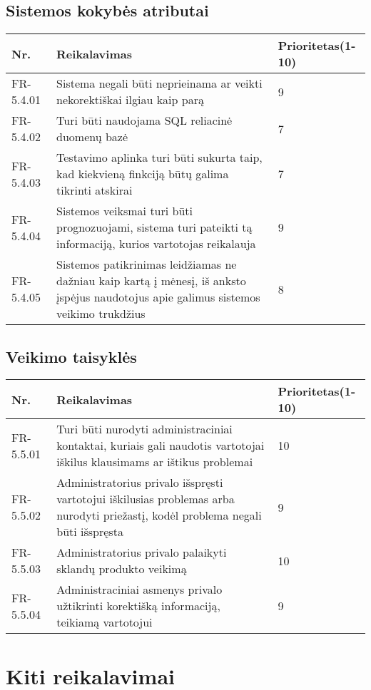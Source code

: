 \documentclass[oneside]{VUMIFPSkursinis}
\begin{document}
\subsection{Sistemos kokybės atributai}
\begin{table}[htbp]
	\begin{tabularx}{1\textwidth}{ |P{2.5cm}|X|P{3cm }| }  \hline
		Nr. & Reikalavimas & Prioritetas(1-10) \\ \hline
		FR-5.4.01 & Sistema negali būti neprieinama ar veikti nekorektiškai ilgiau kaip parą & 9 \\ \hline
		FR-5.4.02 & Turi būti naudojama SQL reliacinė duomenų bazė  & 7 \\ \hline
		FR-5.4.03 & Testavimo aplinka turi būti sukurta taip, kad kiekvieną finkciją būtų galima tikrinti atskirai & 7 \\ \hline
		FR-5.4.04 & Sistemos veiksmai turi būti prognozuojami, sistema turi pateikti tą informaciją, kurios vartotojas reikalauja & 9 \\ \hline
		FR-5.4.05 & Sistemos patikrinimas leidžiamas ne dažniau kaip kartą į mėnesį, iš anksto įspėjus naudotojus apie galimus sistemos veikimo trukdžius  & 8 \\ \hline
	\end{tabularx}
\end{table}
\subsection{Veikimo taisyklės}
\begin{table}[htbp]
	\begin{tabularx}{1\textwidth}{ |P{2.5cm}|X|P{3cm }| }  \hline
		Nr. & Reikalavimas & Prioritetas(1-10) \\ \hline
		FR-5.5.01 & Turi būti nurodyti administraciniai kontaktai, kuriais gali naudotis vartotojai iškilus klausimams ar ištikus problemai & 10 \\ \hline
		FR-5.5.02 & Administratorius privalo išspręsti vartotojui iškilusias problemas arba nurodyti priežastį, kodėl problema negali būti išspręsta  & 9 \\ \hline
		FR-5.5.03 & Administratorius privalo palaikyti sklandų produkto veikimą & 10 \\ \hline
		FR-5.5.04 & Administraciniai asmenys privalo užtikrinti korektišką informaciją, teikiamą vartotojui & 9 \\ \hline
	\end{tabularx}
\end{table}

\section{Kiti reikalavimai}
\end{document}
